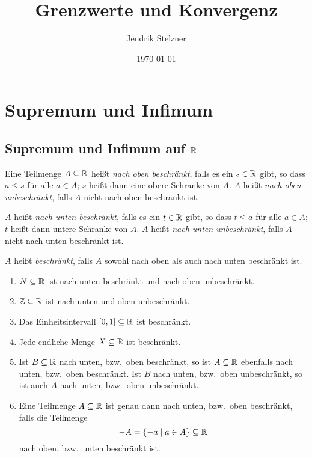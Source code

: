 \documentclass[a4paper,10pt]{article}
\title{Grenzwerte und Konvergenz}
\author{Jendrik Stelzner}
\date{\today}
\begin{document}
\maketitle

\tableofcontents





\section{Supremum und Infimum}



\subsection{Supremum und Infimum auf $\mathbb{R}$}


\begin{defi}
 Eine Teilmenge $A \subseteq \mathbb{R}$ heißt \emph{nach oben beschränkt}, falls es ein $s \in \mathbb{R}$ gibt, so dass $a \leq s$ für alle $a \in A$; $s$ heißt dann eine obere Schranke von $A$. $A$ heißt \emph{nach oben unbeschränkt}, falls $A$ nicht nach oben beschränkt ist.
 
 $A$ heißt \emph{nach unten beschränkt}, falls es ein $t \in \mathbb{R}$ gibt, so dass $t \leq a$ für alle $a \in A$; $t$ heißt dann untere Schranke von $A$. $A$ heißt \emph{nach unten unbeschränkt}, falls $A$ nicht nach unten beschränkt ist.
 
 $A$ heißt \emph{beschränkt}, falls $A$ sowohl nach oben als auch nach unten beschränkt ist.
\end{defi}


\begin{bsp}
 \begin{enumerate}
  \item
   $N \subseteq \mathbb{R}$ ist nach unten beschränkt und nach oben unbeschränkt.
  \item
   $\mathbb{Z} \subseteq \mathbb{R}$ ist nach unten und oben unbeschränkt.
  \item
   Das Einheitsintervall $[0,1] \subseteq \mathbb{R}$ ist beschränkt.
  \item
   Jede endliche Menge $X \subseteq \mathbb{R}$ ist beschränkt.
  \item
   Ist $B \subseteq \mathbb{R}$ nach unten, bzw.\ oben beschränkt, so ist $A \subseteq \mathbb{R}$ ebenfalls nach unten, bzw.\ oben beschränkt. Ist $B$ nach unten, bzw.\ oben unbeschränkt, so ist auch $A$ nach unten, bzw.\ oben unbeschränkt.
  \item
   Eine Teilmenge $A \subseteq \mathbb{R}$ ist genau dann nach unten, bzw.\ oben beschränkt, falls die Teilmenge
   \[
    -A = \{-a \mid a \in A\} \subseteq \mathbb{R}
   \]
   nach oben, bzw.\ unten beschränkt ist.
 \end{enumerate}
\end{bsp}
\end{document}
